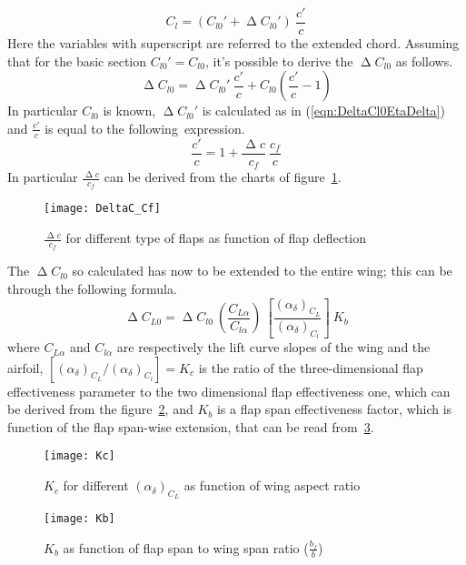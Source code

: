 %
\begin{equation}
C_{l}=\left(C_{l0}'+\upDelta C_{l0}'\right)\ \frac{c'}{c}
\label{eqn:clExtendedChord}
\end{equation}
%
\noindent 
Here the variables with superscript are referred to the extended chord. Assuming that for the basic section $C_{l0}'=C_{l0}$, it's possible to derive the $\upDelta C_{l0}$ as follows.
%
\begin{equation}
\upDelta C_{l0}=\upDelta C_{l0}'\ \frac{c'}{c}+C_{l0}\left(\frac{c'}{c}-1\right)
\label{eqn:Deltacl0Final}
\end{equation}
%
\noindent
In particular $C_{l0}$ is known, $\upDelta C_{l0}'$ is calculated as in (\ref{eqn:DeltaCl0EtaDelta}) and $\frac{c'}{c}$ is equal to the following~expression.
%
\begin{equation}
\frac{c'}{c}=1+\frac{\upDelta c}{c_f}\ \frac{c_f}{c}
\label{eqn:c'/c}
\end{equation}
%
\noindent
In particular $\frac{\upDelta c}{c_f}$ can be derived from the charts of figure~\ref{fig:DeltaCCf}.
%
\begin{figure}[!t]
  \centering
  \texttt{[image: DeltaC\_Cf]}
  \caption{$\frac{\upDelta c}{c_f}$ for different type of flaps as function of flap deflection}
  \label{fig:DeltaCCf}
\end{figure}
%
\noindent
The $\upDelta C_{l0}$ so calculated has now to be extended to the entire wing; this can be through the following formula.
%
\begin{equation}
\upDelta C_{L0}=\upDelta C_{l0}\ \left(\frac{C_{L\alpha}}{C_{l\alpha}}\right)\ \left[\frac{\left(\alpha_\delta\right)_{C_{L}}}{\left(\alpha_\delta\right)_{C_{l}}}\right]\ K_b
\label{eqn:c'/c}
\end{equation}
%
\noindent
where $C_{L\alpha}$ and $C_{l\alpha}$ are respectively the lift curve slopes of the wing and the airfoil, $\left[\left(\alpha_\delta\right)_{C_{L}}/\left(\alpha_\delta\right)_{C_{l}}\right]=K_c$ is the ratio of the three-dimensional flap effectiveness parameter to the two dimensional flap effectiveness one, which can be derived from the figure~\ref{fig:Kc}, and $K_b$ is a flap span effectiveness factor, which is function of the flap span-wise extension, that can be  read from~\ref{fig:Kb}.
%
\begin{figure}[!b]
  \centering
  \texttt{[image: Kc]}
  \caption{$K_c$ for different $\left(\alpha_\delta\right)_{C_{L}}$ as function of wing aspect ratio}
  \label{fig:Kc}
\end{figure}
%
\begin{figure}[!t]
  \centering
  \texttt{[image: Kb]}
  \caption{$K_b$ as function of flap span to wing span ratio ($\frac{b_f}{b}$)}
  \label{fig:Kb}
\end{figure}
%
